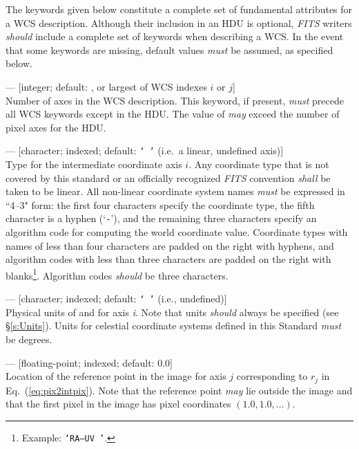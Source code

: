 \documentclass[11pt,makeidx]{book}     %
\begin{document}
The keywords given below constitute a complete set of fundamental attributes for a
WCS description. Although their inclusion in an HDU is optional, {\em FITS\/} writers
{\em should} include a complete set of keywords when describing a WCS. In the
event that some keywords are missing, default values {\em must} be assumed, as
specified below. 

\begin{description}

\item {} --- [integer; default: , or 
largest of WCS indexes $i$ or $j$]\\ 
Number of axes in the WCS description. This keyword, if present,
{\em must} precede all WCS keywords except  in the HDU. The value of
 {\em may} exceed the number of pixel axes for the HDU. 

\item {} --- [character; indexed; default: \texttt{`\ '} (i.e.\ a
linear, undefined axis)] \\ 
Type for the intermediate coordinate axis $i$. Any
coordinate type that is not covered by this standard or an officially recognized
{\em FITS\/} convention {\em shall} be taken to be linear. All non-linear coordinate
system names {\em must} be expressed in ``4--3" form: the first four characters
specify the coordinate type, the fifth character is a hyphen (`{\tt -}'), and the
remaining three characters specify an algorithm code for computing the world
coordinate value. Coordinate types with names of less than four characters are
padded on the right with hyphens, and algorithm codes with less than three
characters are padded on the right with blanks\footnote[1]{Example: 
\texttt{`RA---UV~'}.}. 
Algorithm codes {\em should} be three characters. 

\item {} --- [character; indexed; default: \texttt{`\ '} (i.e.,
undefined)]\\ 
Physical units of  and  for axis {\it i}. Note
that units {\em should} always be specified (see \S\ref{s:Units}). Units for celestial
coordinate systems defined in this Standard {\em must} be degrees. 

\item {} --- [floating-point; indexed; default: 0.0]\\ 
Location of the reference point in the image for axis $j$
corresponding to $r_j$ in Eq.~(\ref{eq:pix2intpix}).  Note that the
reference point {\em may} lie outside the image and that the first pixel
in the image has pixel coordinates $(1.0, 1.0, \ldots)$. 


\end{description}
\end{document}
